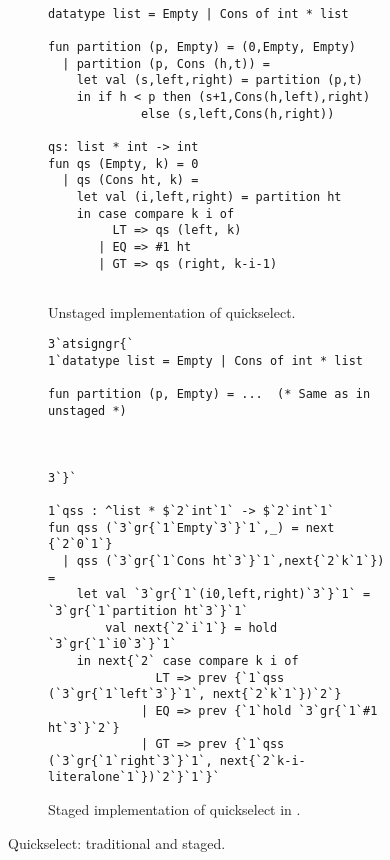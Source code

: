 
\begin{figure*}[t]
\begin{subfigure}[t]{0.45\textwidth}
\begin{lstlisting} 

datatype list = Empty | Cons of int * list

fun partition (p, Empty) = (0,Empty, Empty) 
  | partition (p, Cons (h,t)) = 
    let val (s,left,right) = partition (p,t) 
    in if h < p then (s+1,Cons(h,left),right) 
             else (s,left,Cons(h,right))

qs: list * int -> int
fun qs (Empty, k) = 0
  | qs (Cons ht, k) =
    let val (i,left,right) = partition ht
    in case compare k i of
         LT => qs (left, k)
       | EQ => #1 ht
       | GT => qs (right, k-i-1)
       
\end{lstlisting}
\caption{Unstaged implementation of quickselect.}
\label{fig:qs-unstaged}
\end{subfigure}
\hfill
\begin{subfigure}[t]{0.55\textwidth}
\begin{lstlisting} 
3`atsigngr{`  
1`datatype list = Empty | Cons of int * list

fun partition (p, Empty) = ...  (* Same as in unstaged *)



3`}`

1`qss : ^list * $`2`int`1` -> $`2`int`1`
fun qss (`3`gr{`1`Empty`3`}`1`,_) = next {`2`0`1`}
  | qss (`3`gr{`1`Cons ht`3`}`1`,next{`2`k`1`}) = 
    let val `3`gr{`1`(i0,left,right)`3`}`1` = `3`gr{`1`partition ht`3`}`1`
        val next{`2`i`1`} = hold `3`gr{`1`i0`3`}`1`
    in next{`2` case compare k i of
               LT => prev {`1`qss (`3`gr{`1`left`3`}`1`, next{`2`k`1`})`2`}
             | EQ => prev {`1`hold `3`gr{`1`#1 ht`3`}`2`}
             | GT => prev {`1`qss (`3`gr{`1`right`3`}`1`, next{`2`k-i-literalone`1`})`2`}`1`}`
\end{lstlisting}
\caption{Staged implementation of quickselect in \lang.}

\label{fig:qs-staged}
\end{subfigure}
\caption{Quickselect: traditional and staged.}
\end{figure*}

